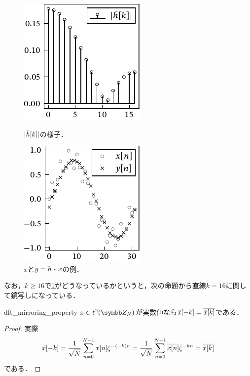 \documentclass[../../main]{subfiles}
\begin{document}
\begin{figure}[htbp]
  \begin{minipage}{\linewidth/2}
    \centering
    \includegraphics{figures/filter_characteristics.pdf}
    \caption{\(\lvert\hat{h}[k]\rvert\)の様子．}
    \label{figure:filter_characteristics}
    \end{minipage}%
  \begin{minipage}{\linewidth/2}
    \centering
    \includegraphics{figures/filtering.pdf}
    \caption{\(x\)と\(y=h\ast x\)の例．}
  \end{minipage}
\end{figure}

なお，\(k\geq 16\)で\cref{figure:filter_characteristics}がどうなっているかというと，次の命題から直線\(k=16\)に関して鏡写しになっている．

\begin{proposition}{}{dft_mirroring_property}
  \(x\in\cycles{N}\)が実数値なら\(\hat{x}[-k]=\conj*{\hat{x}[k]}\)である．
\end{proposition}

\begin{proof}
  実際
  \[
    \hat{x}[-k] = \frac{1}{\sqrt{N}}\sum_{n=0}^{N-1}x[n]\zeta^{-(-k)n}
    = \frac{1}{\sqrt{N}}\sum_{n=0}^{N-1}\conj*{x[n]}\conj{\zeta}^{-kn}
    = \conj*{\hat{x}[k]}
  \]
  である．
\end{proof}
\end{document}
